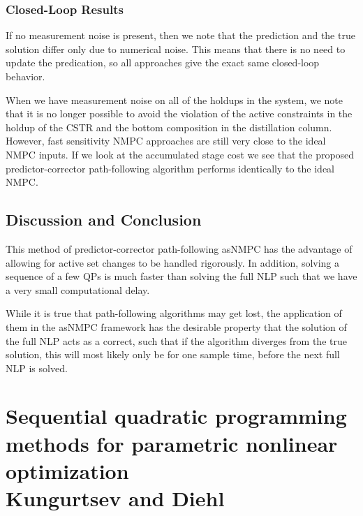 \documentclass{article}
\theoremstyle{example}
\theoremstyle{definition}
\theoremstyle{assumption}
\theoremstyle{lemma}
\begin{document}
\subsubsection{Closed-Loop Results}
If no measurement noise is present, then we note that the prediction and the true solution differ only due to numerical noise.
This means that there is no need to update the predication, so all approaches give the exact same closed-loop behavior.
\par
When we have measurement noise on all of the holdups in the system, we note that it is no longer possible to avoid the violation of the active constraints in the holdup of the CSTR and the bottom composition in the distillation column.
However, fast sensitivity NMPC approaches are still very close to the ideal NMPC inputs.
If we look at the accumulated stage cost we see that the proposed predictor-corrector path-following algorithm performs identically to the ideal NMPC.
\subsection{Discussion and Conclusion}
This method of predictor-corrector path-following asNMPC has the advantage of allowing for active set changes to be handled rigorously.
In addition, solving a sequence of a few QPs is much faster than solving the full NLP such that we have a very small computational delay.
\par
While it is true that path-following algorithms may get lost, the application of them in the asNMPC framework has the desirable property that the solution of the full  NLP acts as a correct, such that if the algorithm diverges from the true solution, this will most likely only be for one sample time, before the next full NLP is solved.
\section{Sequential quadratic programming methods for parametric nonlinear optimization\\{Kungurtsev and Diehl}}
\end{document}
